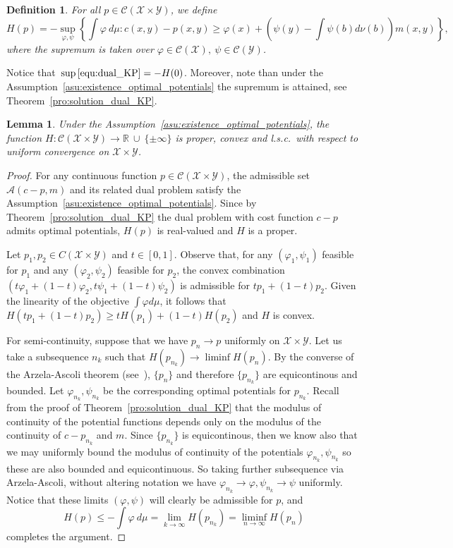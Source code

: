 \documentclass{article}
\newtheorem{definition}[theorem]{Definition}
\newtheorem{lemma}[theorem]{Lemma}
\theoremstyle{definition}
\def\cC{\mathcal{C}}
\begin{document}
\begin{definition}
	For all $p\in \cC(\mathcal X \times \mathcal Y)$, we define
	\[
	H(p) = - \sup_{\varphi, \psi} \left\{ \int \varphi \ d\mu : c(x,y) - p(x,y) \geq \varphi(x) + \left( \psi(y) - \int \psi(b) d\nu(b) \right) m(x,y) \right\},
	\]
    where the supremum is taken over $\varphi\in \cC(\mathcal X), \ \psi\in \cC(\mathcal Y)$.
\end{definition}

Notice that~$\sup \eqref{equ:dual_KP} = -H(0)$. Moreover, note than under the Assumption~\ref{asu:existence_optimal_potentials} the supremum is attained, see Theorem~\ref{pro:solution_dual_KP}. 


\begin{lemma}\label{lemma:Hconvexlsc}
	Under the Assumption~\ref{asu:existence_optimal_potentials}, the function $H: \cC(\mathcal X \times \mathcal Y) \to \mathbb R \ \cup \ \{\pm \infty\}$ is proper, convex and l.s.c.~with respect to uniform convergence on $\mathcal X \times \mathcal Y$. 
\end{lemma}
\begin{proof}

For any continuous function $p\in \cC(\mathcal X \times \mathcal Y)$, the admissible set $\mathcal{A} (c - p, m)$ and its related dual problem satisfy the Assumption~\ref{asu:existence_optimal_potentials}. Since by Theorem~\ref{pro:solution_dual_KP} the dual problem with cost function $c-p$ admits optimal potentials, $H(p)$ is real-valued and $H$ is a proper.


    Let $p_1, p_2 \in  C(\mathcal X \times \mathcal Y)$ and $t\in [0,1]$. Observe that, for any $(\varphi_1, \psi_1)$ feasible for $p_1$ and any $(\varphi_2, \psi_2)$ feasible for $p_2$, the convex combination $(t\varphi_1 + (1-t) \varphi_2, t \psi_1 + (1-t)\psi_2)$ is admissible for $tp_1 + (1-t)p_2$. Given the linearity of the objective $\int \varphi d\mu$, it follows that $H(tp_1 + (1-t)p_2) \geq tH(p_1) + (1-t) H(p_2)$ and $H$ is convex.
    
	
 For semi-continuity, suppose that we have $p_n \to p$ uniformly on $\mathcal X \times \mathcal Y$. Let us take a subsequence $n_k$ such that $H(p_{n_k}) \to \liminf H(p_{n})$. By the converse of the Arzela-Ascoli theorem (see~\cite[Theorem 7.25]{rudin1976principles}), $\{p_n\}$ and therefore $\{p_{n_k}\}$ are equicontinous and bounded. Let $\varphi_{n_k}, \psi_{n_k}$ be the corresponding optimal potentials for $p_{n_k}$. Recall from the proof of Theorem~\ref{pro:solution_dual_KP} that the modulus of continuity of the potential functions depends only on the modulus of the continuity of $c - p_{n_k}$ and $m$. Since $\{p_{n_k}\}$ is equicontinous, then we know also that we may uniformly bound the modulus of continuity of the potentials $\varphi_{n_k}, \psi_{n_k}$ so these are also bounded and equicontinuous. So taking further subsequence via Arzela-Ascoli, without altering notation we have $\varphi_{n_k} \to \varphi, \psi_{n_k}\to \psi$ uniformly. Notice that these limits $(\varphi, \psi)$ will clearly be admissible for $p$, and
\[
H(p) \leq - \int \varphi \ d\mu  = \lim_{k\to \infty} H(p_{n_k}) = \liminf_{n\to \infty} H(p_n)
\]
completes the argument.
\end{proof}
\end{document}
